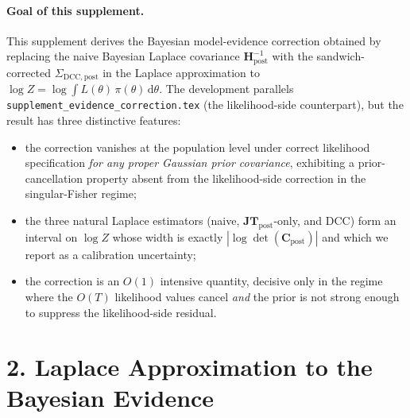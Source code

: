\documentclass[11pt]{article}
\begin{document}
\paragraph{Goal of this supplement.}
This supplement derives the Bayesian model-evidence correction obtained by replacing
the naive Bayesian Laplace covariance $\mathbf H_{\mathrm{post}}^{-1}$ with the
sandwich-corrected $\Sigma_{\mathrm{DCC},\mathrm{post}}$ in the Laplace approximation
to $\log Z = \log \int L(\theta)\,\pi(\theta)\,\mathrm{d}\theta$. The development
parallels \texttt{supplement\_evidence\_correction.tex} (the likelihood-side counterpart),
but the result has three distinctive features:
\begin{itemize}
\item the correction vanishes at the population level under correct likelihood
specification \emph{for any proper Gaussian prior covariance}, exhibiting a
prior-cancellation property absent from the likelihood-side correction in the
singular-Fisher regime;
\item the three natural Laplace estimators (naive, $\mathbf{JT}_{\mathrm{post}}$-only,
and DCC) form an interval on $\log Z$ whose width is exactly $|\log\det(\mathbf C_{\mathrm{post}})|$
and which we report as a calibration uncertainty;
\item the correction is an $O(1)$ intensive quantity, decisive only in the regime where
the $O(T)$ likelihood values cancel \emph{and} the prior is not strong enough to suppress
the likelihood-side residual.
\end{itemize}

\section*{2. Laplace Approximation to the Bayesian Evidence}
\end{document}
